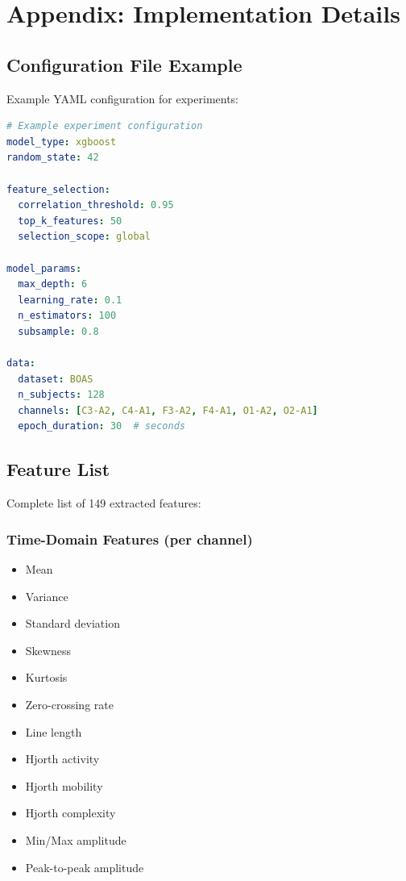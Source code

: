 \chapter{Appendix: Implementation Details}
\label{app:implementation}


\section{Configuration File Example}
\label{app:config_example}

Example YAML configuration for experiments:

\begin{lstlisting}[language=yaml]
# Example experiment configuration
model_type: xgboost
random_state: 42

feature_selection:
  correlation_threshold: 0.95
  top_k_features: 50
  selection_scope: global

model_params:
  max_depth: 6
  learning_rate: 0.1
  n_estimators: 100
  subsample: 0.8

data:
  dataset: BOAS
  n_subjects: 128
  channels: [C3-A2, C4-A1, F3-A2, F4-A1, O1-A2, O2-A1]
  epoch_duration: 30  # seconds
\end{lstlisting}

\section{Feature List}
\label{app:feature_list}

Complete list of 149 extracted features:


\subsection{Time-Domain Features (per channel)}
\label{app:time_features}

\begin{itemize}
    \item Mean
    \item Variance
    \item Standard deviation
    \item Skewness
    \item Kurtosis
    \item Zero-crossing rate
    \item Line length
    \item Hjorth activity
    \item Hjorth mobility
    \item Hjorth complexity
    \item Min/Max amplitude
    \item Peak-to-peak amplitude
\end{itemize}

